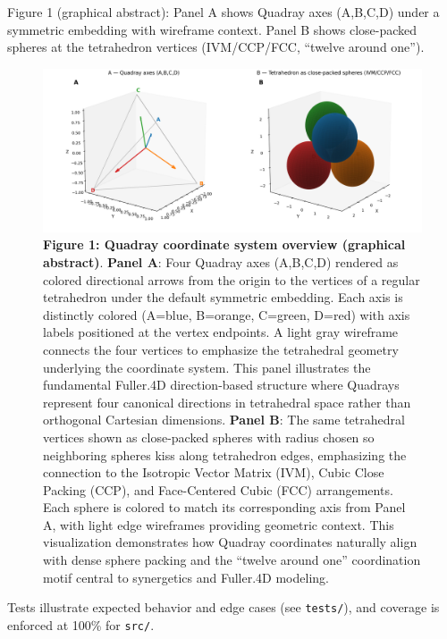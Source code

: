 \documentclass[
  10pt,
]{article}
\newcommand{\passthrough}[1]{#1}
\begin{document}
Figure 1 (graphical abstract): Panel A shows Quadray axes (A,B,C,D)
under a symmetric embedding with wireframe context. Panel B shows
close-packed spheres at the tetrahedron vertices (IVM/CCP/FCC, ``twelve
around one'').

\begin{figure}
\centering
\includegraphics{../output/figures/graphical_abstract_quadray.png}
\caption{\textbf{Figure 1: Quadray coordinate system overview (graphical
abstract)}. \textbf{Panel A}: Four Quadray axes (A,B,C,D) rendered as
colored directional arrows from the origin to the vertices of a regular
tetrahedron under the default symmetric embedding. Each axis is
distinctly colored (A=blue, B=orange, C=green, D=red) with axis labels
positioned at the vertex endpoints. A light gray wireframe connects the
four vertices to emphasize the tetrahedral geometry underlying the
coordinate system. This panel illustrates the fundamental Fuller.4D
direction-based structure where Quadrays represent four canonical
directions in tetrahedral space rather than orthogonal Cartesian
dimensions. \textbf{Panel B}: The same tetrahedral vertices shown as
close-packed spheres with radius chosen so neighboring spheres kiss
along tetrahedron edges, emphasizing the connection to the Isotropic
Vector Matrix (IVM), Cubic Close Packing (CCP), and Face-Centered Cubic
(FCC) arrangements. Each sphere is colored to match its corresponding
axis from Panel A, with light edge wireframes providing geometric
context. This visualization demonstrates how Quadray coordinates
naturally align with dense sphere packing and the ``twelve around one''
coordination motif central to synergetics and Fuller.4D modeling.}
\end{figure}

Tests illustrate expected behavior and edge cases (see
\passthrough{\lstinline!tests/!}), and coverage is enforced at 100\% for
\passthrough{\lstinline!src/!}.
\end{document}
